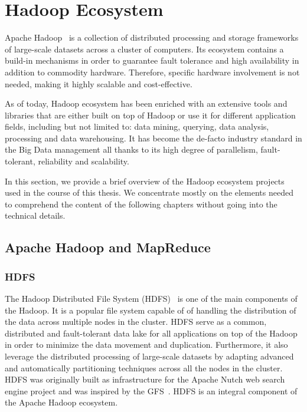 \section{Hadoop Ecosystem}
\label{sec:preliminaries-distributed-frameworks}
Apache Hadoop~\cite{White:2015:HDG:2904397} is a collection of distributed processing and storage frameworks of large-scale datasets across a cluster of computers.
Its ecosystem contains a build-in mechanisms in order to guarantee fault tolerance and high availability in addition to commodity hardware.
Therefore, specific hardware involvement is not needed, making it highly scalable and cost-effective.

As of today, Hadoop ecosystem has been enriched with an extensive tools and libraries that are either built on top of Hadoop or use it for different application fields, including but not limited to: data mining, querying, data analysis, processing and data warehousing.
It has become the de-facto industry standard in the Big Data management all thanks to its high degree of parallelism, fault-tolerant, reliability and scalability.

In this section, we provide a brief overview of the Hadoop ecosystem projects used in the course of this thesis.
We concentrate mostly on the elements needed to comprehend the content of the following chapters without going into the technical details.

\subsection{Apache Hadoop and MapReduce}

\subsubsection{HDFS}
The Hadoop Distributed File System (\gls{HDFS})~\cite{Shvachko:2010:HDF:1913798.1914427} is one of the main components of the Hadoop. 
It is a popular file system capable of of handling the distribution of the data across multiple nodes in the cluster.
HDFS serve as a common, distributed and fault-tolerant data lake for all applications on top of the Hadoop in order to minimize the data movement and duplication.
Furthermore, it also leverage the distributed processing of large-scale datasets by adapting advanced and automatically partitioning techniques across all the nodes in the cluster.
\gls{HDFS} was originally built as infrastructure for the Apache Nutch web search engine project and was inspired by the \gls{GFS}~\cite{Ghemawat:2003:GFS:945445.945450}. 
\gls{HDFS} is an integral component of the Apache Hadoop ecosystem.

